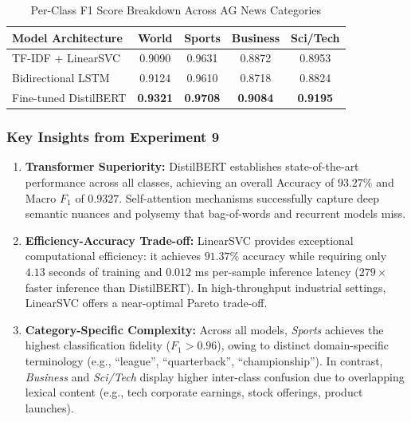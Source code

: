 \begin{table}[H]
\centering
\caption{Per-Class F1 Score Breakdown Across AG News Categories}
\label{tab:exp9_class_f1}
\begin{tabular}{lcccc}
\toprule
\textbf{Model Architecture} & \textbf{World} & \textbf{Sports} & \textbf{Business} & \textbf{Sci/Tech} \\
\midrule
TF-IDF + LinearSVC & 0.9090 & 0.9631 & 0.8872 & 0.8953 \\
Bidirectional LSTM & 0.9124 & 0.9610 & 0.8718 & 0.8824 \\
Fine-tuned DistilBERT & \textbf{0.9321} & \textbf{0.9708} & \textbf{0.9084} & \textbf{0.9195} \\
\bottomrule
\end{tabular}
\end{table}

\subsubsection{Key Insights from Experiment 9}
\begin{enumerate}
    \item \textbf{Transformer Superiority:} DistilBERT establishes state-of-the-art performance across all classes, achieving an overall Accuracy of $\mathbf{93.27\%}$ and Macro $F_1$ of $\mathbf{0.9327}$. Self-attention mechanisms successfully capture deep semantic nuances and polysemy that bag-of-words and recurrent models miss.
    \item \textbf{Efficiency-Accuracy Trade-off:} LinearSVC provides exceptional computational efficiency: it achieves $\mathbf{91.37\%}$ accuracy while requiring only $\mathbf{4.13}$ seconds of training and $\mathbf{0.012}$ ms per-sample inference latency ($279\times$ faster inference than DistilBERT). In high-throughput industrial settings, LinearSVC offers a near-optimal Pareto trade-off.
    \item \textbf{Category-Specific Complexity:} Across all models, \textit{Sports} achieves the highest classification fidelity ($F_1 > 0.96$), owing to distinct domain-specific terminology (e.g., ``league'', ``quarterback'', ``championship''). In contrast, \textit{Business} and \textit{Sci/Tech} display higher inter-class confusion due to overlapping lexical content (e.g., tech corporate earnings, stock offerings, product launches).
\end{enumerate}

